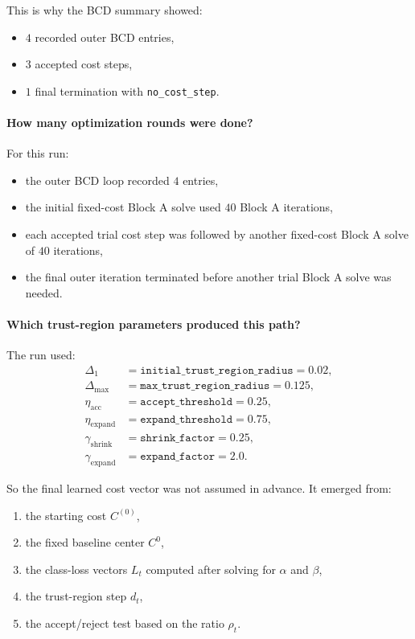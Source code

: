 \documentclass[11pt]{article}
\begin{document}
This is why the BCD summary showed:
\begin{itemize}
\item $4$ recorded outer BCD entries,
\item $3$ accepted cost steps,
\item $1$ final termination with \texttt{no\_cost\_step}.
\end{itemize}

\paragraph{How many optimization rounds were done?}
For this run:
\begin{itemize}
\item the outer BCD loop recorded $4$ entries,
\item the initial fixed-cost Block A solve used $40$ Block A iterations,
\item each accepted trial cost step was followed by another fixed-cost Block A
solve of $40$ iterations,
\item the final outer iteration terminated before another trial Block A solve
was needed.
\end{itemize}

\paragraph{Which trust-region parameters produced this path?}
The run used:
\begin{align}
\Delta_1 &= \texttt{initial\_trust\_region\_radius} = 0.02, \\
\Delta_{\max} &= \texttt{max\_trust\_region\_radius} = 0.125, \\
\eta_{\mathrm{acc}} &= \texttt{accept\_threshold} = 0.25, \\
\eta_{\mathrm{expand}} &= \texttt{expand\_threshold} = 0.75, \\
\gamma_{\mathrm{shrink}} &= \texttt{shrink\_factor} = 0.25, \\
\gamma_{\mathrm{expand}} &= \texttt{expand\_factor} = 2.0.
\end{align}

So the final learned cost vector was not assumed in advance. It emerged from:
\begin{enumerate}
\item the starting cost $C^{(0)}$,
\item the fixed baseline center $C^0$,
\item the class-loss vectors $L_t$ computed after solving for $\alpha$ and
$\beta$,
\item the trust-region step $d_t$,
\item the accept/reject test based on the ratio $\rho_t$.
\end{enumerate}
\end{document}
